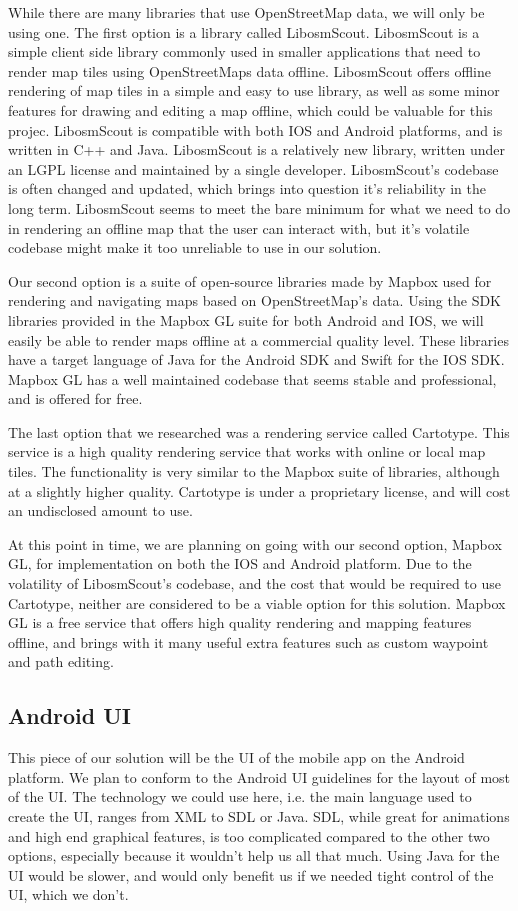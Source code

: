 \documentclass[letterpaper, 10pt,titlepage]{article}
\begin{document}
While there are many libraries that use OpenStreetMap data, we will only be using one. The first option is a library called LibosmScout. LibosmScout is a simple client side library commonly used in smaller applications that need to render map tiles using OpenStreetMaps data offline. LibosmScout offers offline rendering of map tiles in a simple and easy to use library, as well as some minor features for drawing and editing a map offline, which could be valuable for this projec. LibosmScout is compatible with both IOS and Android platforms, and is written in C++ and Java. LibosmScout is a relatively new library, written under an LGPL license and maintained by a single developer. LibosmScout’s codebase is often changed and updated, which brings into question it’s reliability in the long term. LibosmScout seems to meet the bare minimum for what we need to do in rendering an offline map that the user can interact with, but it’s volatile codebase might make it too unreliable to use in our solution. 


Our second option is a suite of open-source libraries made by Mapbox used for rendering and navigating maps based on OpenStreetMap’s data. Using the SDK libraries provided in the Mapbox GL suite for both Android and IOS, we will easily be able to render maps offline at a commercial quality level. These libraries have a target language of Java for the Android SDK and Swift for the IOS SDK. Mapbox GL has a well maintained codebase that seems stable and professional, and is offered for free. 


The last option that we researched was a rendering service called Cartotype. This service is a high quality rendering service that works with online or local map tiles. The functionality is very similar to the Mapbox suite of libraries, although at a slightly higher quality. Cartotype is under a proprietary license, and will cost an undisclosed amount to use. 


At this point in time, we are planning on going with our second option, Mapbox GL, for implementation on both the IOS and Android platform. Due to the volatility of LibosmScout’s codebase, and the cost that would be required to use Cartotype, neither are considered to be a viable option for this solution. Mapbox GL is a free service that offers high quality rendering and mapping features offline, and brings with it many useful extra features such as custom waypoint and path editing.

\subsection{Android UI}
This piece of our solution will be the UI of the mobile app on the Android platform. We plan to conform to the Android UI guidelines for the layout of most of the UI. The technology we could use here, i.e. the main language used to create the UI, ranges from XML to SDL or Java. SDL, while great for animations and high end graphical features, is too complicated compared to the other two options, especially because it wouldn't help us all that much. Using Java for the UI would be slower, and would only benefit us if we needed tight control of the UI, which we don’t. 
\end{document}
